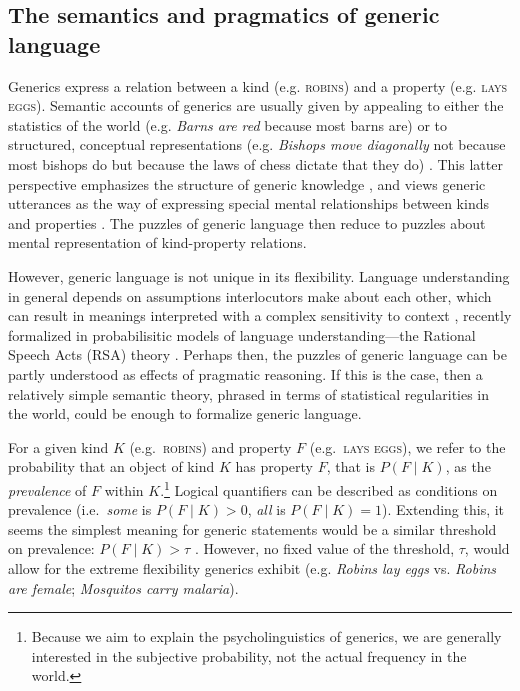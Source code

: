\documentclass{pnastwo}
\begin{document}
\begin{article}
\section{The semantics and pragmatics of generic language}


Generics express a relation between a kind (e.g. \textsc{robins}) and a property (e.g. \textsc{lays eggs}). 
Semantic accounts of generics are usually given by appealing to either the statistics of the world (e.g. \emph{Barns are red} because most barns are) or to structured, conceptual representations (e.g. \emph{Bishops move diagonally} not because most bishops do but because the laws of chess dictate that they do) \cite{Carlson1995essay}. 
This latter perspective emphasizes the structure of generic knowledge \cite{Prasada2000}, and views generic utterances as the way of expressing special mental relationships between kinds and properties \cite{Leslie2008, Prasada2012}. The puzzles of generic language then reduce to puzzles about mental representation of kind-property relations.

However, generic language is not unique in its flexibility.
Language understanding in general depends on assumptions interlocutors make about each other, which can result in meanings interpreted with a complex sensitivity to context \cite{Clark1996,Grice1975,Levinson2000}, recently formalized in probabilisitic models of language understanding---the Rational Speech Acts (RSA) theory \cite{Frank2012,Goodman2013}. 
Perhaps then, the puzzles of generic language can be partly understood as effects of pragmatic reasoning.
If this is the case, then a relatively simple semantic theory, phrased in terms of statistical regularities in the world, could be enough to formalize generic language.

For a given kind $K$ (e.g.~\textsc{robins}) and property $F$ (e.g.~\textsc{lays eggs}), we refer to the probability that an object of kind $K$ has property $F$, that is $P(F\mid K)$, as the \emph{prevalence} of $F$ within $K$.\footnote{Because we aim to explain the psycholinguistics of generics, we are generally interested in the subjective probability, not the actual frequency in the world.}
Logical quantifiers can be described as conditions on prevalence (i.e.~\emph{some} is $P(F\mid K)>0$, \emph{all} is $P(F\mid K)=1$). 
Extending this, it seems the simplest meaning for generic statements would be a similar threshold on prevalence: $P(F\mid K)>\tau$ \cite{Cohen1999}. 
However, no fixed value of the threshold, $\tau$, would allow for the extreme flexibility generics exhibit (e.g. \emph{Robins lay eggs} vs. \emph{Robins are female}; \emph{Mosquitos carry malaria}).%




\end{article}
\end{document}

